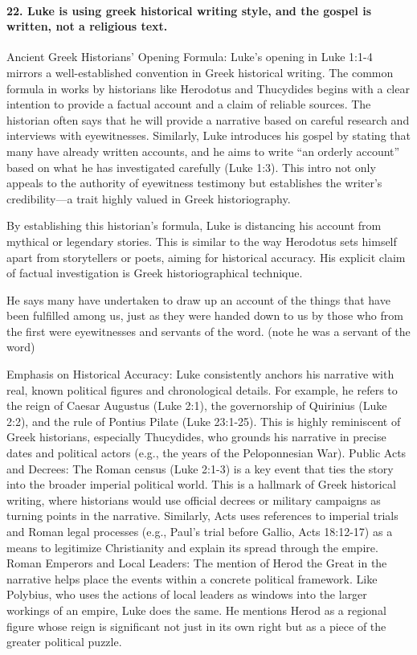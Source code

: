 \paragraph{22.
Luke is using greek historical writing style, and the gospel is written, not a religious text.}\label{par:luke-is-using-greek-historical-writing-style-and-the-gospel-is-written-not-a-religious-text.}

Ancient Greek Historians' Opening Formula: Luke's opening in Luke 1:1-4 mirrors a well-established convention in Greek historical writing.
The common formula in works by historians like Herodotus and Thucydides begins with a clear intention to provide a factual account and a claim of reliable sources.
The historian often says that he will provide a narrative based on careful research and interviews with eyewitnesses.
Similarly, Luke introduces his gospel by stating that many have already written accounts, and he aims to write ``an orderly account'' based on what he has investigated carefully (Luke 1:3).
This intro not only appeals to the authority of eyewitness testimony but establishes the writer's credibility---a trait highly valued in Greek historiography.

By establishing this historian's formula, Luke is distancing his account from mythical or legendary stories.
This is similar to the way Herodotus sets himself apart from storytellers or poets, aiming for historical accuracy.
His explicit claim of factual investigation is Greek historiographical technique.

He says many have undertaken to draw up an account of the things that have been fulfilled among us, just as they were handed down to us by those who from the first were eyewitnesses and servants of the word.
(note he was a servant of the word)

Emphasis on Historical Accuracy: Luke consistently anchors his narrative with real, known political figures and chronological details.
For example, he refers to the reign of Caesar Augustus (Luke 2:1), the governorship of Quirinius (Luke 2:2), and the rule of Pontius Pilate (Luke 23:1-25).
This is highly reminiscent of Greek historians, especially Thucydides, who grounds his narrative in precise dates and political actors (e.g., the years of the Peloponnesian War).
Public Acts and Decrees: The Roman census (Luke 2:1-3) is a key event that ties the story into the broader imperial political world.
This is a hallmark of Greek historical writing, where historians would use official decrees or military campaigns as turning points in the narrative.
Similarly, Acts uses references to imperial trials and Roman legal processes (e.g., Paul's trial before Gallio, Acts 18:12-17) as a means to legitimize Christianity and explain its spread through the empire.
Roman Emperors and Local Leaders: The mention of Herod the Great in the narrative helps place the events within a concrete political framework.
Like Polybius, who uses the actions of local leaders as windows into the larger workings of an empire, Luke does the same.
He mentions Herod as a regional figure whose reign is significant not just in its own right but as a piece of the greater political puzzle.

